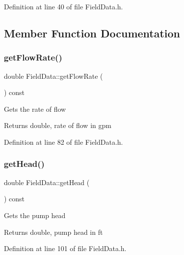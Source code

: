 Definition at line 40 of file Field\+Data.\+h.



\subsection{Member Function Documentation}
\mbox{\label{class_field_data_a59b3261a5162b002d7b73a2d35561bd0}} 
\subsubsection{\texorpdfstring{get\+Flow\+Rate()}{getFlowRate()}}
{\footnotesize\ttfamily double Field\+Data\+::get\+Flow\+Rate (\begin{DoxyParamCaption}{ }\end{DoxyParamCaption}) const\hspace{0.3cm}{\ttfamily [inline]}}

Gets the rate of flow

\begin{DoxyReturn}{Returns}
double, rate of flow in gpm 
\end{DoxyReturn}


Definition at line 82 of file Field\+Data.\+h.

\mbox{\label{class_field_data_ac3e8e0b2de226c858b6c92cdb454bd0d}} 
\subsubsection{\texorpdfstring{get\+Head()}{getHead()}}
{\footnotesize\ttfamily double Field\+Data\+::get\+Head (\begin{DoxyParamCaption}{ }\end{DoxyParamCaption}) const\hspace{0.3cm}{\ttfamily [inline]}}

Gets the pump head

\begin{DoxyReturn}{Returns}
double, pump head in ft 
\end{DoxyReturn}


Definition at line 101 of file Field\+Data.\+h.

\mbox{\label{class_field_data_ae213fa76dd005d7fd251ef26beecd311}} 
